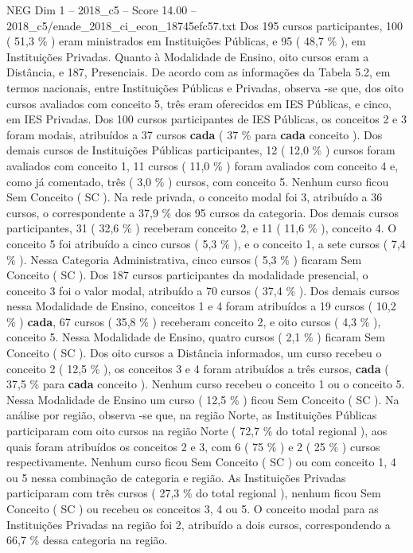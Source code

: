 \begin{textsample}{NEG Dim 1 – 2018\_c5 – Score 14.00 – 2018\_c5/enade\_2018\_ci\_econ\_18745efc57.txt}
Dos 195 cursos participantes, 100 ( 51,3 \% ) eram ministrados em Instituições Públicas, e 95 ( 48,7 \% ), em Instituições Privadas.
Quanto à Modalidade de Ensino, oito cursos eram a Distância, e 187, Presenciais.
De acordo com as informações da Tabela 5.2, em termos nacionais, entre Instituições Públicas e Privadas, observa -se que, dos oito cursos avaliados com conceito 5, três eram oferecidos em IES Públicas, e cinco, em IES Privadas.
Dos 100 cursos participantes de IES Públicas, os conceitos 2 e 3 foram modais, atribuídos a 37 cursos \textbf{cada} ( 37 \% para \textbf{cada} conceito ).
Dos demais cursos de Instituições Públicas participantes, 12 ( 12,0 \% ) cursos foram avaliados com conceito 1, 11 cursos ( 11,0 \% ) foram avaliados com conceito 4 e, como já comentado, três ( 3,0 \% ) cursos, com conceito 5.
Nenhum curso ficou Sem Conceito ( SC ).
Na rede privada, o conceito modal foi 3, atribuído a 36 cursos, o correspondente a 37,9 \% dos 95 cursos da categoria.
Dos demais cursos participantes, 31 ( 32,6 \% ) receberam conceito 2, e 11 ( 11,6 \% ), conceito 4.
O conceito 5 foi atribuído a cinco cursos ( 5,3 \% ), e o conceito 1, a sete cursos ( 7,4 \% ).
Nessa Categoria Administrativa, cinco cursos ( 5,3 \% ) ficaram Sem Conceito ( SC ).
Dos 187 cursos participantes da modalidade presencial, o conceito 3 foi o valor modal, atribuído a 70 cursos ( 37,4 \% ).
Dos demais cursos nessa Modalidade de Ensino, conceitos 1 e 4 foram atribuídos a 19 cursos ( 10,2 \% ) \textbf{cada}, 67 cursos ( 35,8 \% ) receberam conceito 2, e oito cursos ( 4,3 \% ), conceito 5.
Nessa Modalidade de Ensino, quatro cursos ( 2,1 \% ) ficaram Sem Conceito ( SC ).
Dos oito cursos a Distância informados, um curso recebeu o conceito 2 ( 12,5 \% ), os conceitos 3 e 4 foram atribuídos a três cursos, \textbf{cada} ( 37,5 \% para \textbf{cada} conceito ).
Nenhum curso recebeu o conceito 1 ou o conceito 5.
Nessa Modalidade de Ensino um curso ( 12,5 \% ) ficou Sem Conceito ( SC ).
Na análise por região, observa -se que, na região Norte, as Instituições Públicas participaram com oito cursos na região Norte ( 72,7 \% do total regional ), aos quais foram atribuídos os conceitos 2 e 3, com 6 ( 75 \% ) e 2 ( 25 \% ) cursos respectivamente.
Nenhum curso ficou Sem Conceito ( SC ) ou com conceito 1, 4 ou 5 nessa combinação de categoria e região.
As Instituições Privadas participaram com três cursos ( 27,3 \% do total regional ), nenhum ficou Sem Conceito ( SC ) ou recebeu os conceitos 3, 4 ou 5.
O conceito modal para as Instituições Privadas na região foi 2, atribuído a dois cursos, correspondendo a 66,7 \% dessa categoria na região.

\end{textsample}
